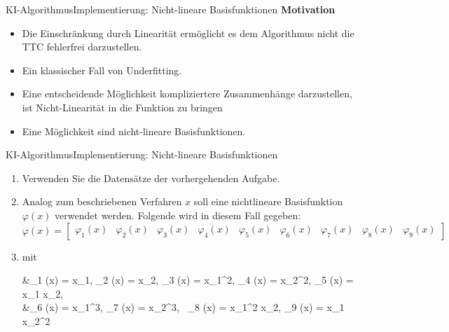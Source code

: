 \documentclass[169, handout	]{THIbeamer} %
\begin{document}
	\begin{frame}{KI-Algorithmus}{Implementierung: Nicht-lineare Basisfunktionen}
		\textbf{Motivation}
		\begin{itemize}
			\item Die Einschränkung durch Linearität ermöglicht es dem Algorithmus nicht die TTC fehlerfrei darzustellen.
			\item Ein klassischer Fall von Underfitting.
			\item Eine entscheidende Möglichkeit kompliziertere Zusammenhänge darzustellen, ist Nicht-Linearität in die Funktion zu bringen
			\item Eine Möglichkeit sind nicht-lineare Basisfunktionen. 
		\end{itemize}					

	\end{frame}
	\begin{frame}{KI-Algorithmus}{Implementierung: Nicht-lineare Basisfunktionen}
		\begin{enumerate}
			\item Verwenden Sie die Datensätze der vorhergehenden Aufgabe.
			\item Analog zum beschriebenen Verfahren $x$ soll eine nichtlineare Basisfunktion $\varphi (x)$ verwendet werden. Folgende wird in diesem Fall gegeben:
			\begin{equation*}
				\varphi (x) = 
				\begin{bmatrix}
					\varphi_1(x) & \varphi_2(x) & \varphi_3(x) & \varphi_4(x) & \varphi_5(x) &
					\varphi_6(x) & \varphi_7(x) & \varphi_8(x) & \varphi_9(x)
				\end{bmatrix}
			\end{equation*}
			\item[] mit
			\begin{flalign}
				&\varphi_1 (x) = x_1, \hspace{0.2 cm} \varphi_2 (x) = x_2, \hspace{0.2 cm} 						\varphi_3 (x) = x_1^2, \hspace{0.2 cm} \varphi_4 (x) = x_2^2, \hspace{0.2 cm} 
				\varphi_5 (x) = x_1 x_2, \nonumber \\
				&\varphi_6 (x) = x_1^3,\hspace{0.2 cm} \varphi_7 (x) = x_2^3,\hspace{0.2 cm} \
				\varphi_8 (x) = x_1^2 x_2, \hspace{0.2 cm}  \varphi_9 (x) = x_1 x_2^2 \nonumber
			\end{flalign}
		\end{enumerate}
	\end{frame}
\end{document}
